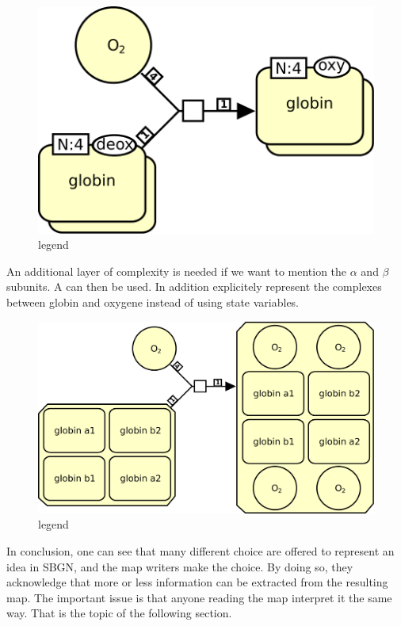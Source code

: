 \begin{figure}[H]
  \centering
  \includegraphics[scale = 0.4]{le_images/hemoglobin-multimer}
  \caption{legend}
  \label{fig:hemoglobin-multimer}
\end{figure}

An additional layer of complexity is needed if we want to mention the $\alpha$ and $\beta$ subunits. A  can then be used. In addition  explicitely represent the complexes between globin and oxygene instead of using state variables.

\begin{figure}[H]
  \centering
  \includegraphics[scale = 0.4]{le_images/hemoglobin-complex}
  \caption{legend}
  \label{fig:hemoglobin-complex}
\end{figure}

In conclusion, one can see that many different choice are offered to represent an idea in SBGN, and the map writers make the choice. By doing so, they acknowledge that more or less information can be extracted from the resulting map. The important issue is that anyone reading the map interpret it the same way. That is the topic of the following section. 

